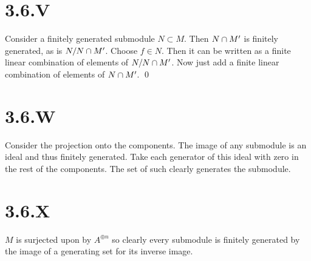 \documentclass{article}
\begin{document}
\section{3.6.V}
Consider a finitely generated submodule $N \subset M$. Then
$N \cap M'$ is finitely generated, as is $N/N \cap M'$.
Choose $f \in N$. Then it can be written as a finite linear
combination of elements of $N/N \cap M'$. Now just add a finite
linear combination of elements of $N \cap M'$. \qed

\section{3.6.W}
Consider the projection onto the components. The image of any submodule is an
ideal and thus finitely generated. Take each generator of this ideal with zero
in the rest of the components. The set of such clearly generates the submodule.

\section{3.6.X}
$M$ is surjected upon by $A^{\oplus n}$ so clearly
every submodule is finitely generated by the image of a generating set for its
inverse image.
\end{document}
